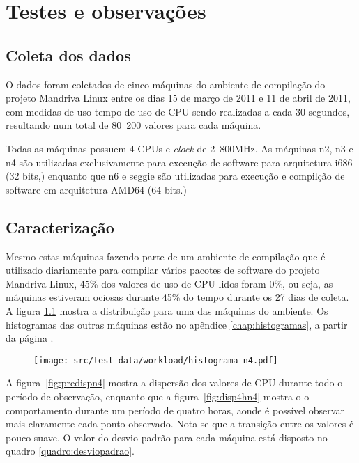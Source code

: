 \chapter{Testes e observações}\label{sec:resultados}

\section{Coleta dos dados}

O dados foram coletados de cinco máquinas do ambiente de compilação do
projeto Mandriva Linux entre os dias 15 de março de 2011 e 11 de abril de
2011, com medidas de uso tempo de uso de CPU sendo realizadas a cada 30
segundos, resultando num total de 80~200 valores para cada máquina.

Todas as máquinas possuem 4 CPUs e \emph{clock} de 2~800MHz. As máquinas n2,
n3 e n4 são utilizadas exclusivamente para execução de software para
arquitetura i686 (32 bits,) enquanto que n6 e seggie são utilizadas para
execução e compilção de software em arquitetura AMD64 (64 bits.)

\section{Caracterização}

Mesmo estas máquinas fazendo parte de um ambiente de compilação que é
utilizado diariamente para compilar vários pacotes de software do projeto
Mandriva Linux, 45\% dos valores de uso de CPU lidos foram 0\%, ou seja,
as máquinas estiveram ociosas durante 45\% do tempo durante os 27 dias de
coleta. A figura \ref{fig:prehistn4} mostra a distribuição para uma das
máquinas do ambiente. Os histogramas das outras máquinas estão no apêndice
\ref{chap:histogramas}, a partir da página \pageref{chap:histogramas}.

\begin{figure}[htp]
\centering
\texttt{[image: src/test-data/workload/histograma-n4.pdf]}
\label{fig:prehistn4}
\end{figure}


A figura~\ref{fig:predispn4} mostra a dispersão dos valores de CPU durante
todo o período de observação, enquanto que a figura~\ref{fig:disp4hn4}
mostra o o comportamento durante um período de quatro horas, aonde é
possível observar mais claramente cada ponto observado. Nota-se que a
transição entre os valores é pouco suave. O valor do desvio padrão para
cada máquina está disposto no quadro \ref{quadro:desviopadrao}.

